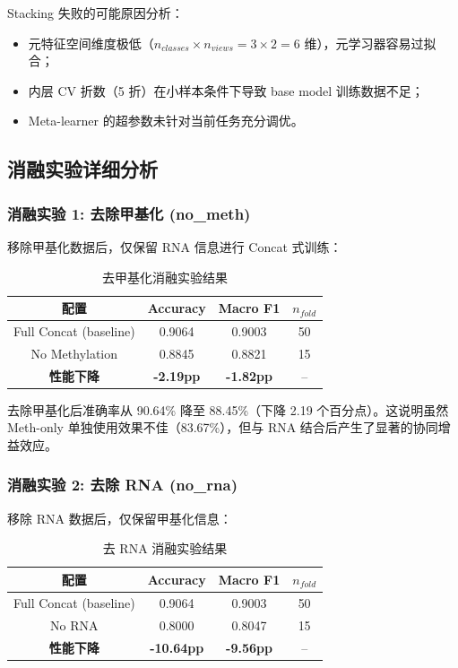Stacking 失败的可能原因分析：
\begin{itemize}
    \item 元特征空间维度极低（$n_{classes} \times n_{views} = 3 \times 2 = 6$ 维），元学习器容易过拟合；
    \item 内层 CV 折数（5 折）在小样本条件下导致 base model 训练数据不足；
    \item Meta-learner 的超参数未针对当前任务充分调优。
\end{itemize}

\subsection{消融实验详细分析}

\subsubsection{消融实验 1: 去除甲基化 (no\_meth)}

移除甲基化数据后，仅保留 RNA 信息进行 Concat 式训练：

\begin{table}[htbp]
\centering
\caption{去甲基化消融实验结果}
\label{tab:ablation_no_meth}
\begin{tabular}{|c|ccc|}
\hline
\textbf{配置} & \textbf{Accuracy} & \textbf{Macro F1} & $n_{fold}$ \\
\hline
Full Concat (baseline) & 0.9064 & 0.9003 & 50 \\
No Methylation & 0.8845 & 0.8821 & 15 \\
\textbf{性能下降} & \textbf{-2.19pp} & \textbf{-1.82pp} & -- \\
\hline
\end{tabular}
\end{table}

去除甲基化后准确率从 90.64\% 降至 88.45\%（下降 2.19 个百分点）。这说明虽然 Meth-only 单独使用效果不佳（83.67\%），但与 RNA 结合后产生了显著的协同增益效应。

\subsubsection{消融实验 2: 去除 RNA (no\_rna)}

移除 RNA 数据后，仅保留甲基化信息：

\begin{table}[htbp]
\centering
\caption{去 RNA 消融实验结果}
\label{tab:ablation_no_rna}
\begin{tabular}{|c|ccc|}
\hline
\textbf{配置} & \textbf{Accuracy} & \textbf{Macro F1} & $n_{fold}$ \\
\hline
Full Concat (baseline) & 0.9064 & 0.9003 & 50 \\
No RNA & 0.8000 & 0.8047 & 15 \\
\textbf{性能下降} & \textbf{-10.64pp} & \textbf{-9.56pp} & -- \\
\hline
\end{tabular}
\end{table}


